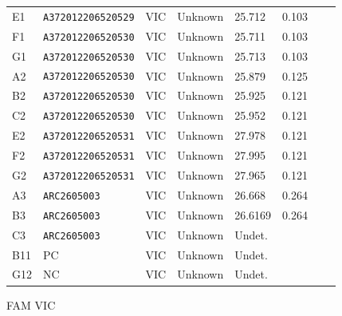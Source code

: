 \documentclass[UTF8,10pt,a4paper,fontset=fandol]{ctexart}
\begin{document}
\begin{center}
\begin{tabular}{p{0.06\linewidth}p{0.19\linewidth}p{0.07\linewidth}p{0.09\linewidth}p{0.08\linewidth}p{0.09\linewidth}p{0.12\linewidth}p{0.12\linewidth}}
E1 & \texttt{A372012206520529} & VIC & Unknown & 25.712 & 0.103 & & \\
F1 & \texttt{A372012206520530} & VIC & Unknown & 25.711 & 0.103 & & \\
G1 & \texttt{A372012206520530} & VIC & Unknown & 25.713 & 0.103 & & \\
A2 & \texttt{A372012206520530} & VIC & Unknown & 25.879 & 0.125 & & \\
B2 & \texttt{A372012206520530} & VIC & Unknown & 25.925 & 0.121 & & \\
C2 & \texttt{A372012206520530} & VIC & Unknown & 25.952 & 0.121 & & \\
E2 & \texttt{A372012206520531} & VIC & Unknown & 27.978 & 0.121 & & \\
F2 & \texttt{A372012206520531} & VIC & Unknown & 27.995 & 0.121 & & \\
G2 & \texttt{A372012206520531} & VIC & Unknown & 27.965 & 0.121 & & \\
A3 & \texttt{ARC2605003} & VIC & Unknown & 26.668 & 0.264 & & \\
B3 & \texttt{ARC2605003} & VIC & Unknown & 26.6169 & 0.264 & & \\
C3 & \texttt{ARC2605003} & VIC & Unknown & Undet. & & & \\
B11 & PC & VIC & Unknown & Undet. & & & \\
G12 & NC & VIC & Unknown & Undet. & & & \\
\hline
\end{tabular}
\end{center}


\begin{center}
\scriptsize
FAM \quad VIC
\end{center}


\newpage

\begin{center}
\end{center}
\end{document}
